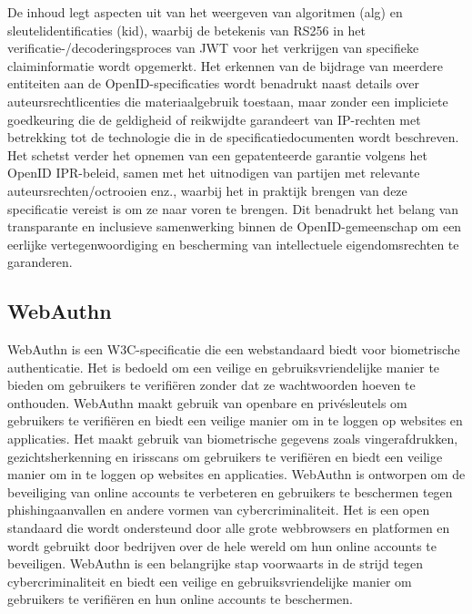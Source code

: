 De inhoud legt aspecten uit van het weergeven van algoritmen (alg) en sleutelidentificaties (kid), waarbij de betekenis van RS256 in het verificatie-/decoderingsproces van JWT voor het verkrijgen van specifieke claiminformatie wordt opgemerkt. Het erkennen van de bijdrage van meerdere entiteiten aan de OpenID-specificaties wordt benadrukt naast details over auteursrechtlicenties die materiaalgebruik toestaan, maar zonder een impliciete goedkeuring die de geldigheid of reikwijdte garandeert van IP-rechten met betrekking tot de technologie die in de specificatiedocumenten wordt beschreven.
Het schetst verder het opnemen van een gepatenteerde garantie volgens het OpenID IPR-beleid, samen met het uitnodigen van partijen met relevante auteursrechten/octrooien enz., waarbij het in praktijk brengen van deze specificatie vereist is om ze naar voren te brengen.
Dit benadrukt het belang van transparante en inclusieve samenwerking binnen de OpenID-gemeenschap om een eerlijke vertegenwoordiging en bescherming van intellectuele eigendomsrechten te garanderen.


\subsection*{WebAuthn}%
\label{subsec:webauthn}
WebAuthn is een W3C-specificatie die een webstandaard biedt voor biometrische authenticatie. Het is bedoeld om een veilige en gebruiksvriendelijke manier te bieden om gebruikers te verifiëren zonder dat ze wachtwoorden hoeven te onthouden. WebAuthn maakt gebruik van openbare en privésleutels om gebruikers te verifiëren en biedt een veilige manier om in te loggen op websites en applicaties. Het maakt gebruik van biometrische gegevens zoals vingerafdrukken, gezichtsherkenning en irisscans om gebruikers te verifiëren en biedt een veilige manier om in te loggen op websites en applicaties. WebAuthn is ontworpen om de beveiliging van online accounts te verbeteren en gebruikers te beschermen tegen phishingaanvallen en andere vormen van cybercriminaliteit. Het is een open standaard die wordt ondersteund door alle grote webbrowsers en platformen en wordt gebruikt door bedrijven over de hele wereld om hun online accounts te beveiligen. WebAuthn is een belangrijke stap voorwaarts in de strijd tegen cybercriminaliteit en biedt een veilige en gebruiksvriendelijke manier om gebruikers te verifiëren en hun online accounts te beschermen.



